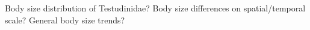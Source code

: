 \begin{frame}
\begin{enumerate}[<+->]
\p Body size distribution of Testudinidae?
\bigskip
\p Body size differences on spatial/temporal scale?
\bigskip
\p General body size trends?
\end{enumerate}
\end{frame}
